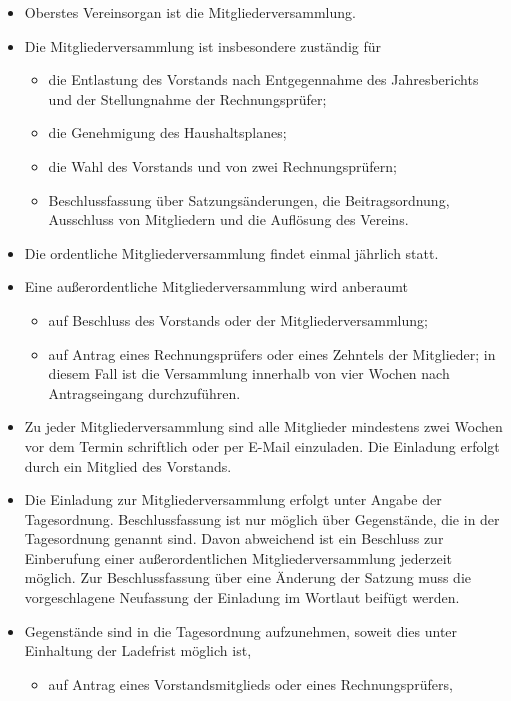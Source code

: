 \documentclass[11pt]{article}
\def\items#1{{%
  \itcounter0%
  \begin{itemize}
  #1
  \end{itemize}
}}
\let\it\item%
\def\item{
  \advance\itcounter1%
  \it[(\the\itcounter)]
}
\begin{document}
\items{
   \item Oberstes Vereinsorgan ist die Mitgliederversammlung.
   \item Die Mitgliederversammlung ist insbesondere zust{\"a}ndig f{\"u}r
     \items{
       \item die Entlastung des Vorstands nach Entgegennahme des Jahresberichts und der
                Stellungnahme der Rechnungspr{\"u}fer;
       \item die Genehmigung des Haushaltsplanes;
       \item die Wahl des Vorstands und von zwei Rechnungspr{\"u}fern;
       \item Beschlussfassung {\"u}ber Satzungs{\"a}nderungen, die Beitragsordnung, Ausschluss von
                Mitgliedern und die Aufl{\"o}sung des Vereins.
     }
   \item Die ordentliche Mitgliederversammlung findet einmal j{\"a}hrlich statt.
   \item Eine au{\ss}erordentliche Mitgliederversammlung wird anberaumt
     \items{
       \item auf Beschluss des Vorstands oder der Mitgliederversammlung;
       \item auf Antrag eines Rechnungspr{\"u}fers oder eines
                Zehntels der Mitglieder; in diesem Fall ist die Versammlung innerhalb von
                vier Wochen nach Antragseingang durchzuf{\"u}hren.
     }
   \item Zu jeder Mitgliederversammlung sind alle Mitglieder mindestens zwei Wochen vor
       dem Termin schriftlich oder per E-Mail einzuladen.
       Die Einladung erfolgt durch ein Mitglied des Vorstands.
   \item
       Die Einladung zur Mitgliederversammlung erfolgt unter Angabe der Tagesordnung.
       Beschlussfassung ist nur m{\"o}glich {\"u}ber Gegenst{\"a}nde, die in der Tagesordnung
       genannt sind. Davon abweichend ist ein Beschluss zur Einberufung einer
       au{\ss}erordentlichen Mitgliederversammlung jederzeit m{\"o}glich.
       Zur Beschlussfassung {\"u}ber eine {\"A}nderung der Satzung muss die vorgeschlagene
       Neufassung der Einladung im Wortlaut beif{\"u}gt werden.
    \item 
       Gegenst{\"a}nde sind in die Tagesordnung aufzunehmen, soweit dies unter Einhaltung der
       Ladefrist m{\"o}glich ist,
      \items{
        \item auf Antrag eines Vorstandsmitglieds oder eines Rechnungspr{\"u}fers,
}}
\end{document}
